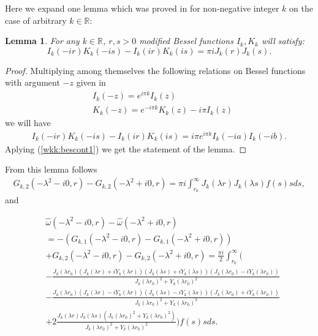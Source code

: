 \documentclass[manuscript, printscheme]{paper}
\newtheorem{lem}[thm]{Lemma}
\newcommand{\RM}{\mathbb{R}}
\begin{document}
Here we expand one lemma which was proved in \cite{G2} for non-negative integer $k$ on the case of arbitrary $k\in\RM$:
\begin{lem} \label{wkk:besselrelationlem}
For any $k\in \RM$,  $r,s > 0$ modified Bessel functions $I_k,K_k$ will satisfy: 
$$
I_k(-ir)K_k(-is) - I_k(i r)K_k(is) = \pi i J_k( r)J_k( s).
$$
\end{lem}
\begin{proof}
Multiplying among themselves the following relations on Bessel functions with argument $-z$ given in \cite{W}
\begin{align*}
&I_k(-z)=e^{i\pi k} I_k(z) \\
&K_k(-z)=e^{-i\pi k} K_k(z) -i\pi I_k(z) 
\end{align*}
we will have
\begin{align*}
I_k(-ir)K_k(-is) - I_k(i r)K_k(is) = i\pi e^{i\pi k}I_k(-ia)I_k(-ib).
\end{align*}
Aplying (\ref{wkk:bescont1}) we get the statement of the lemma.

\end{proof}

From this lemma follows
\begin{align*}
G_{k,2}(-\lambda^2-i0,r)  - G_{k,2}(-\lambda^2+i0,r) = \pi i \int_{r_0}^\infty J_k(\lambda r) J_k(\lambda s) f(s) s ds,
\end{align*}
and

\begin{align*}&\hat \omega(-\lambda^2-i0,r) - \hat \omega(-\lambda^2+i0,r) \nonumber \\ 
&=-\left (G_{k,1}(-\lambda^2-i0,r)  - G_{k,1}(-\lambda^2+i0,r) \right ) \nonumber \\
&+ G_{k,2}(-\lambda^2-i0,r)  - G_{k,2}(-\lambda^2+i0,r)   
=\frac{\pi i}2 \int_{r_0}^\infty \Big ( \\ &- \frac{J_{k}(\lambda r_0)(J_k(\lambda r)+iY_k(\lambda r)) (J_k(\lambda s)+iY_k(\lambda s)) (J_{k}(\lambda r_0)-iY_{k}(\lambda r_0) )}{J_{k}(\lambda r_0)^2+Y_{k}(\lambda r_0)^2}\\
&- \frac{J_{k}(\lambda r_0)(J_k(\lambda r)-iY_k(\lambda r)) (J_k(\lambda s)-iY_k(\lambda s))(J_{k}(\lambda r_0)+iY_{k}(\lambda r_0))}{J_{k}(\lambda r_0)^2+Y_{k}(\lambda r_0)^2}
\\
&+2\frac {J_k(\lambda r) J_k(\lambda s) (J_{k}(\lambda r_0)^2+Y_{k}(\lambda r_0)^2)} {J_{k}(\lambda r_0)^2+Y_{k}(\lambda r_0)^2} \Big )  f(s) s ds.\\
\end{align*}
\end{document}
